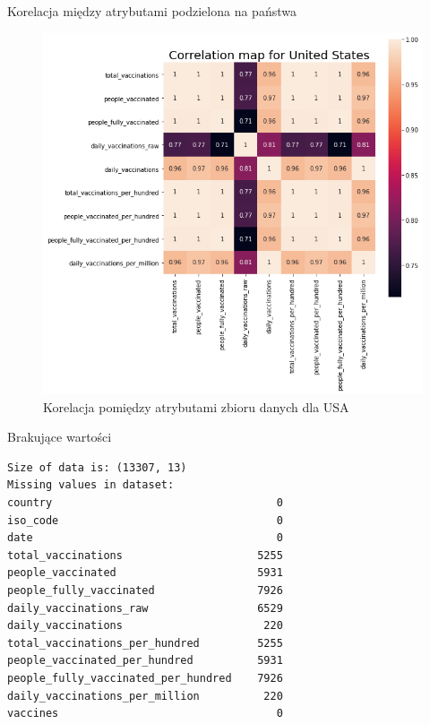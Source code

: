 \documentclass[11pt]{beamer}
\begin{document}
\begin{frame}{Korelacja między atrybutami podzielona na państwa}
\begin{figure}
\includegraphics[scale=0.4]{../img/usa_corr.png} 
\caption{Korelacja pomiędzy atrybutami zbioru danych dla USA}
\label{Rys:corrHeatMapUsa}
\end{figure}
\end{frame}


\begin{frame}[fragile]{Brakujące wartości}
\begin{lstlisting}
Size of data is: (13307, 13)
Missing values in dataset: 
country                                   0
iso_code                                  0
date                                      0
total_vaccinations                     5255
people_vaccinated                      5931
people_fully_vaccinated                7926
daily_vaccinations_raw                 6529
daily_vaccinations                      220
total_vaccinations_per_hundred         5255
people_vaccinated_per_hundred          5931
people_fully_vaccinated_per_hundred    7926
daily_vaccinations_per_million          220
vaccines                                  0
\end{lstlisting}
\end{frame}
\end{document}
